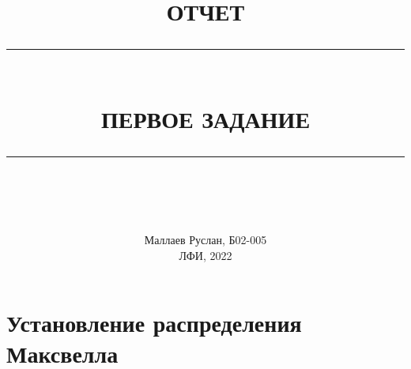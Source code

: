 \documentclass[a4paper, 12pt]{article}
\author{}
\title{}
\date{}
\newcommand{\HRule}[1]{\rule{\linewidth}{#1}}
\begin{document}
\title{ \normalsize \textsc{ОТЧЕТ}
		\\ [4.0cm]
		\HRule{0.5pt} \\ [0.3cm]
		\LARGE \textbf{{ПЕРВОЕ ЗАДАНИЕ}}
		\HRule{0.5pt} \\ [0.1cm]
		\normalsize  \vspace*{20\baselineskip}}

\date{}

\author{
		Маллаев Руслан, Б02-005 \\
ЛФИ, 2022\\ }

\maketitle
\thispagestyle{empty}
\newpage

\part{Установление распределения Максвелла}
\end{document}
